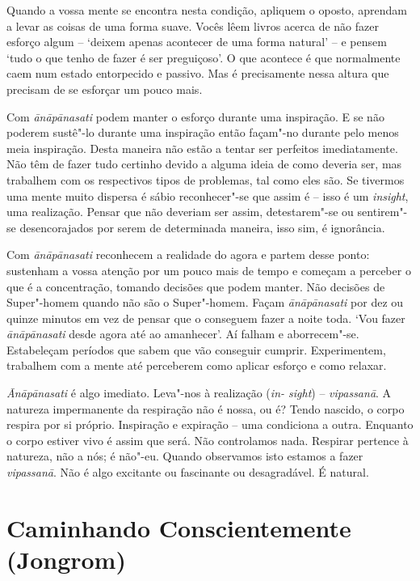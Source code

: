 Quando a vossa mente se encontra nesta condição, apliquem o oposto,
aprendam a levar as coisas de uma forma suave. Vocês lêem livros acerca
de não fazer esforço algum -- `deixem apenas
acontecer de uma forma natural' -- e pensem `tudo o que tenho de
fazer é ser preguiçoso'. O que acontece é que normalmente caem num
estado entorpecido e passivo. Mas é precisamente nessa altura que
precisam de se esforçar um pouco mais.

Com \emph{ānāpānasati} podem manter o esforço durante uma inspiração. E
se não poderem sustê"-lo durante uma inspiração então façam"-no durante
pelo menos meia inspiração. Desta maneira não estão a tentar ser
perfeitos imediatamente. Não têm de fazer tudo certinho devido a alguma
ideia de como deveria ser, mas trabalhem com os respectivos tipos de
problemas, tal como eles são. Se tivermos uma mente muito dispersa é
sábio reconhecer"-se que assim é -- isso é um \emph{insight}, uma
realização. Pensar que não deveriam ser assim, detestarem"-se ou
sentirem"-se desencorajados por serem de determinada maneira, isso sim, é
ignorância.

Com \emph{ānāpānasati} reconhecem a realidade do agora e partem desse
ponto: sustenham a vossa atenção por um pouco mais de tempo e começam a
perceber o que é a concentração, tomando decisões que podem manter. Não
decisões de Super"-homem quando não são o Super"-homem. Façam
\emph{ānāpānasati} por dez ou quinze minutos em vez de pensar que o
conseguem fazer a noite toda. `Vou fazer \emph{ānāpānasati} desde agora
até ao amanhecer'. Aí falham e aborrecem"-se. Estabeleçam períodos que
sabem que vão conseguir cumprir. Experimentem, trabalhem com a mente até
perceberem como aplicar esforço e como relaxar.

\emph{Ānāpānasati} é algo imediato. Leva"-nos à realização (\emph{in-
sight}) -- \emph{vipassanā}. A natureza impermanente da respiração não é
nossa, ou é? Tendo nascido, o corpo respira por si próprio. Inspiração e
expiração -- uma condiciona a outra. Enquanto o corpo estiver vivo é
assim que será. Não controlamos nada. Respirar pertence à natureza, não
a nós; é não"-eu. Quando observamos isto estamos a fazer
\emph{vipassanā}. Não é algo excitante ou fascinante ou desagradável. É
natural.

\chapter{Caminhando Conscientemente (Jongrom)}

